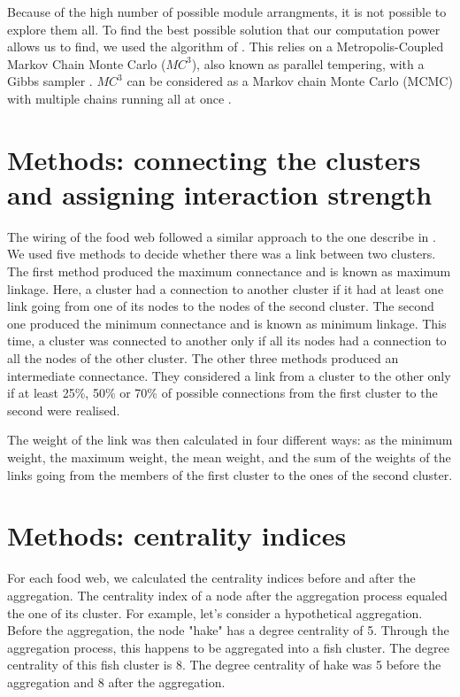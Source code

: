 \documentclass[twocolumn]{article}
\begin{document}
		Because of the high number of possible module arrangments, it is not possible to explore them all. To find the best possible solution that our computation power allows us to find, we used the algorithm of \citet{Sander2015}. This relies on a Metropolis-Coupled Markov Chain Monte Carlo ($MC^3$), also known as parallel tempering\citep{Geyer1991}, with a Gibbs sampler \citep{Yildirim2012}. $MC^3$ can be considered as a Markov chain Monte Carlo (MCMC) with multiple chains running all at once \citep{Sander2015}.

\section*{Methods: connecting the clusters and assigning interaction strength}

	The wiring of the food web followed a similar approach to the one describe in \citet{Martinez1991}. We used five methods to decide whether there was a link between two clusters. The first method produced the maximum connectance and is known as maximum linkage. Here, a cluster had a connection to another cluster if it had at least one link going from one of its nodes to the nodes of the second cluster. The second one produced the minimum connectance and is known as minimum linkage. This time, a cluster was connected to another only if all its nodes had a connection to all the nodes of the other cluster. The other three methods produced an intermediate connectance. They considered a link from a cluster to the other only if at least 25\%, 50\% or 70\% of possible connections from the first cluster to the second were realised.

	The weight of the link was then calculated in four different ways: as the minimum weight, the maximum weight, the mean weight, and the sum of the weights of the links going from the members of the first cluster to the ones of the second cluster.

\section*{Methods: centrality indices}

	For each food web, we calculated the centrality indices before and after the aggregation. The centrality index of a node after the aggregation process equaled the one of its cluster. For example, let's consider a hypothetical aggregation. Before the aggregation, the node "hake" has a degree centrality of 5. Through the  aggregation process, this happens to be aggregated into a fish cluster. The degree centrality of this fish cluster is 8. The degree centrality of hake was 5 before the aggregation and 8 after the aggregation.
\end{document}
